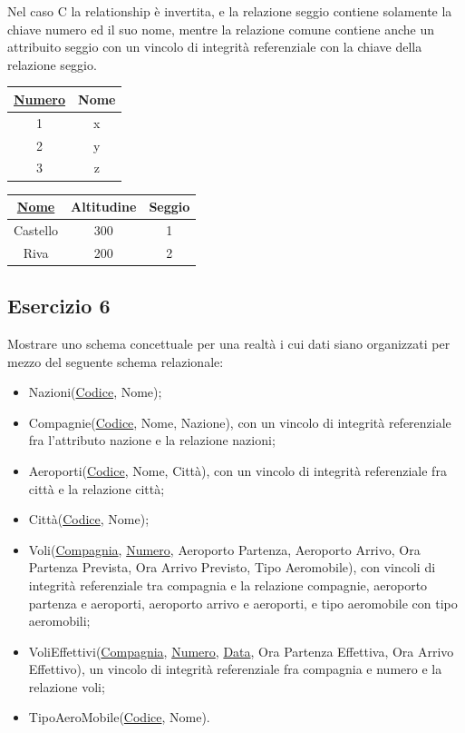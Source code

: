 \documentclass{article}
\numberwithin{equation}{subsection}
\begin{document}
Nel caso C la relationship è invertita, e la relazione seggio contiene solamente la chiave numero ed il suo nome, mentre la relazione comune 
contiene anche un attribuito seggio con un vincolo di integrità referenziale con la chiave della relazione seggio. 
\begin{center}
    \begin{tabular}{|c|c|}
        \hline 
        \underline{Numero} & Nome \\
        \hline
        1 & x \\
        \hline
        2 & y \\
        \hline
        3 & z \\
        \hline
    \end{tabular}
    \begin{tabular}{|c|c|c|}
        \hline
        \underline{Nome} & Altitudine & Seggio\\
        \hline
        Castello & 300 & 1\\
        \hline
        Riva & 200 & 2\\
        \hline
    \end{tabular}
\end{center}

\subsection{Esercizio 6}

Mostrare uno schema concettuale per una realtà i cui dati siano organizzati per mezzo del seguente schema relazionale:
\begin{itemize}
    \item Nazioni(\underline{Codice}, Nome);
    \item Compagnie(\underline{Codice}, Nome, Nazione), con un vincolo di integrità referenziale fra l'attributo nazione e la relazione nazioni;
    \item Aeroporti(\underline{Codice}, Nome, Città), con un vincolo di integrità referenziale fra città e la relazione città;
    \item Città(\underline{Codice}, Nome);
    \item Voli(\underline{Compagnia}, \underline{Numero}, Aeroporto Partenza, Aeroporto Arrivo, Ora Partenza Prevista, Ora Arrivo Previsto, Tipo Aeromobile), con vincoli 
    di integrità referenziale tra compagnia e la relazione compagnie, aeroporto partenza e aeroporti, aeroporto arrivo e aeroporti, e tipo aeromobile con tipo aeromobili;
    \item VoliEffettivi(\underline{Compagnia}, \underline{Numero}, \underline{Data}, Ora Partenza Effettiva, Ora Arrivo Effettivo), un vincolo di integrità referenziale fra compagnia e numero e la relazione voli;
    \item TipoAeroMobile(\underline{Codice}, Nome).
\end{itemize}
\end{document}
